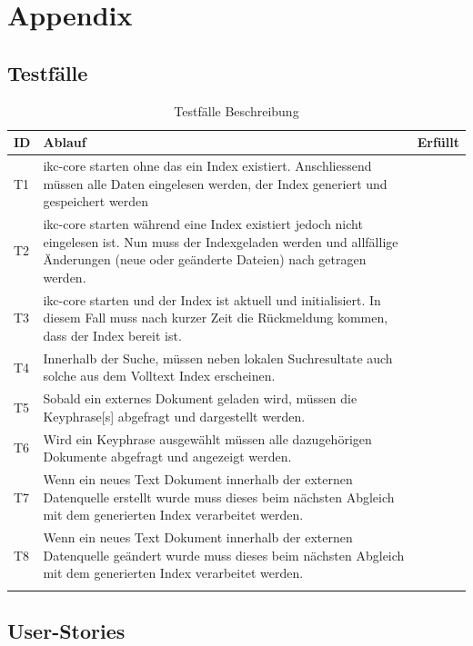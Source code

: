 \chapter{Appendix}

\section{Testfälle} \label{tests}

\begin{longtable}{|p{1cm} | p{10cm} |p{1.2cm} |}
  \hline
    ID & Ablauf & Erfüllt \\\hline
    T1 & \gls{ikc-core} starten ohne das ein Index existiert. Anschliessend müssen alle Daten eingelesen werden, der Index generiert und gespeichert werden& \\\hline
    T2 & \gls{ikc-core} starten während eine Index existiert jedoch nicht eingelesen ist. Nun muss der Indexgeladen werden und allfällige Änderungen (neue oder geänderte Dateien) nach getragen werden.\\\hline
    T3 & \gls{ikc-core} starten und der Index ist aktuell und initialisiert. In diesem Fall muss nach kurzer Zeit die Rückmeldung kommen, dass der Index bereit ist.\\\hline
    T4 & Innerhalb der Suche, müssen neben lokalen Suchresultate auch solche aus dem Volltext Index erscheinen. \\\hline
    T5 & Sobald ein externes Dokument geladen wird, müssen die \gls{Keyphrase}[s] abgefragt und dargestellt werden.\\\hline
    T6 & Wird ein \gls{Keyphrase} ausgewählt müssen alle dazugehörigen Dokumente abgefragt und angezeigt werden.\\\hline
    T7 & Wenn ein neues Text Dokument innerhalb der externen Datenquelle erstellt wurde muss dieses beim nächsten Abgleich mit dem generierten Index verarbeitet werden.\\\hline
    T8 & Wenn ein neues Text Dokument innerhalb der externen Datenquelle geändert wurde muss dieses beim nächsten Abgleich mit dem generierten Index verarbeitet werden.\\\hline
    \caption{Testfälle Beschreibung}
  \label{tab:testkonzept-detail}
\end{longtable}



\section{User-Stories}

